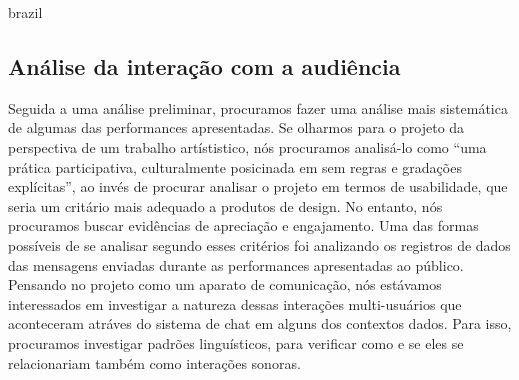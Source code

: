 \begin{otherlanguage*}{brazil}
%


\subsection{Análise da interação com a audiência}

Seguida a uma análise preliminar, procuramos fazer uma análise mais sistemática de algumas das performances apresentadas. Se olharmos para o projeto da perspectiva de um trabalho artístistico, nós procuramos analisá-lo como ``uma prática participativa, culturalmente posicinada em sem regras e gradações explícitas''\cite{McCullough1998}, ao invés de procurar analisar o projeto em termos de usabilidade, que seria um critário mais adequado a produtos de design. No entanto, nós procuramos buscar evidências de apreciação e engajamento. Uma das formas possíveis de se analisar segundo esses critérios foi analizando os registros de dados das mensagens enviadas durante as performances apresentadas ao público. Pensando no projeto como um aparato de comunicação, nós estávamos interessados em investigar a natureza dessas interações multi-usuários que aconteceram atráves do sistema de chat em alguns dos contextos dados. Para isso, procuramos investigar padrões linguísticos, para verificar como e se eles se relacionariam também como interações sonoras.




\end{otherlanguage*}
